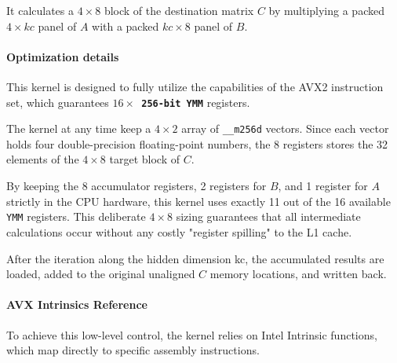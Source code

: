  It calculates a $4 \times 8$ block of the destination matrix $C$ by multiplying a packed $4 \times kc$ panel of $A$ with a packed $kc \times 8$ panel of $B$. 

\paragraph{Optimization details}
This kernel is designed to fully utilize the capabilities of the AVX2 instruction set, which guarantees \texttt{\textbf{$16 \times$ 256-bit YMM}} registers. 

The kernel at any time keep a $4 \times 2$ array of \texttt{\_\_m256d} vectors. Since each vector holds four double-precision floating-point numbers, the 8 registers stores the 32 elements of the $4 \times 8$ target block of $C$.

By keeping the 8 accumulator registers, 2 registers for $B$, and 1 register for $A$ strictly in the CPU hardware, this kernel uses exactly 11 out of the 16 available \texttt{YMM} registers. This deliberate $4 \times 8$ sizing guarantees that all intermediate calculations occur without any costly "register spilling" to the L1 cache. 

After the iteration along the hidden dimension kc, the accumulated results are loaded, added to the original unaligned $C$ memory locations, and written back.

\paragraph{AVX Intrinsics Reference}
To achieve this low-level control, the kernel relies on Intel Intrinsic functions, which map directly to specific assembly instructions.

